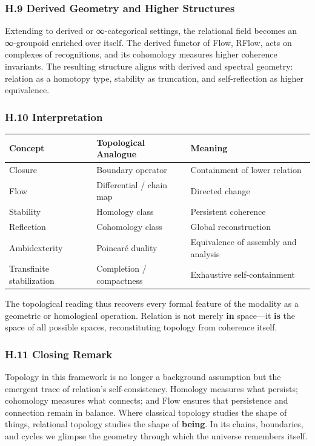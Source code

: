 \documentclass[11pt]{article}
\begin{document}
\subsubsection*{H.9 Derived Geometry and Higher Structures}
\label{sec:orgb003996}
Extending to derived or ∞-categorical settings,  
the relational field becomes an ∞-groupoid enriched over itself.  
The derived functor of Flow, RFlow, acts on complexes of recognitions,  
and its cohomology measures higher coherence invariants.  
The resulting structure aligns with derived and spectral geometry:  
relation as a homotopy type, stability as truncation,  
and self-reflection as higher equivalence.
\subsubsection*{H.10 Interpretation}
\label{sec:orge56cd12}
\begin{center}
\begin{tabular}{lll}
Concept & Topological Analogue & Meaning\\
\hline
Closure & Boundary operator & Containment of lower relation\\
Flow & Differential / chain map & Directed change\\
Stability & Homology class & Persistent coherence\\
Reflection & Cohomology class & Global reconstruction\\
Ambidexterity & Poincaré duality & Equivalence of assembly and analysis\\
Transfinite stabilization & Completion / compactness & Exhaustive self-containment\\
\end{tabular}
\end{center}

The topological reading thus recovers every formal feature of the modality  
as a geometric or homological operation.  
Relation is not merely \textbf{in} space—it \textbf{is} the space of all possible spaces,  
reconstituting topology from coherence itself.
\subsubsection*{H.11 Closing Remark}
\label{sec:orgbdeae3b}
Topology in this framework is no longer a background assumption  
but the emergent trace of relation’s self-consistency.  
Homology measures what persists; cohomology measures what connects;  
and Flow ensures that persistence and connection remain in balance.  
Where classical topology studies the shape of things,  
relational topology studies the shape of \textbf{being}.  
In its chains, boundaries, and cycles we glimpse the geometry  
through which the universe remembers itself.
\end{document}
